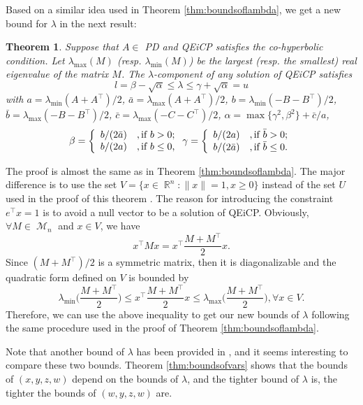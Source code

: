 \documentclass[3p]{elsarticle}
\DeclareMathOperator{\R}{\mathbb{R}}
\DeclareMathOperator{\M}{\mathcal{M}}
\newtheorem{thm}{Theorem}
\begin{document}
Based on a similar idea used in Theorem \ref{thm:boundsoflambda}, we get a new bound for $\lambda$ in the next result:
\begin{thm}\label{thm:boundsoflambdabis}
	Suppose that $A\in$ PD and QEiCP satisfies the co-hyperbolic condition. Let $\lambda_{\max}(M)$ (resp. $\lambda_{\min}(M)$) be the largest (resp. the smallest) real eigenvalue of the matrix $M$. The $\lambda$-component of any solution of QEiCP satisfies
	\[l=\beta-\sqrt{\alpha} \leq \lambda \leq \gamma+\sqrt{\alpha}=u\]
	with $a=\lambda_{\min}(A+A^{\top})/2$, $\bar{a}=\lambda_{\max}(A+A^{\top})/2$, $b=\lambda_{\min}(-B-B^{\top})/2$,  $\bar{b}=\lambda_{\max}(-B-B^{\top})/2$, $\bar{c}=\lambda_{\max}(-C-C^{\top})/2$, $\alpha = \max\{\gamma^2,\beta^2\} + \bar{c}/a$,
	\[\beta = \left\{\begin{array}{ll}
	b/(2\bar{a}) &, \hbox{if $b>0$;} \\
	b/(2a) &, \hbox{if $b\leq 0$,}
	\end{array}
	\right.
	\gamma=\left\{\begin{array}{ll}
	b/(2a) &, \hbox{if $\bar{b}>0$;} \\
	b/(2\bar{a}) &, \hbox{if $\bar{b}\leq0$.}
	\end{array}
	\right.\]
\end{thm}
\begin{pf}
	The proof is almost the same as in Theorem \ref{thm:boundsoflambda}. The major difference is to use the set $V=\{x\in \R^n: \|x\|=1,x\geq 0 \}$ instead of the set $U$ used in the proof of this theorem \cite{Niu15}. The reason for introducing the constraint $e^{\top}x=1$ is to avoid a null vector to be a solution of QEiCP. Obviously, $\forall M\in \M_n$ and $x\in V$, we have
	\[x^{\top}Mx = x^{\top} \frac{M+M^{\top}}{2}x.\]
	Since $(M+M^{\top})/2$ is a symmetric matrix, then it is diagonalizable and the quadratic form defined on $V$ is bounded by 
	\[\lambda_{\min}\big( \frac{M+M^{\top}}{2}\big) \leq x^{\top} \frac{M+M^{\top}}{2}x \leq \lambda_{\max}\big( \frac{M+M^{\top}}{2}\big), \forall x\in V.  \]
	Therefore, we can use the above inequality to get our new bounds of $\lambda$ following the same procedure used in the proof of Theorem \ref{thm:boundsoflambda}.
\end{pf}
\begin{rmk}
	Note that another bound of $\lambda$ has been provided in \cite{Fernandes14}, and it seems interesting to compare these two bounds. Theorem \ref{thm:boundsofvars} shows that the bounds of $(x,y,z,w)$ depend on the bounds of $\lambda$, and the tighter bound of $\lambda$ is, the tighter the bounds of $(w,y,z,w)$ are.
\end{rmk}
\end{document}
